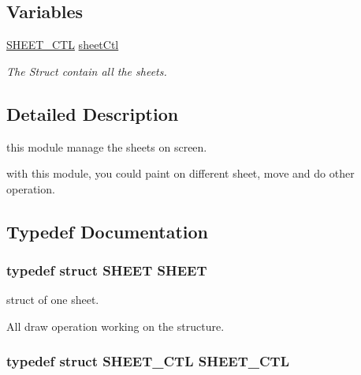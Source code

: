\subsection*{Variables}
\begin{DoxyCompactItemize}
\item 
\hypertarget{group__sheet_ga8fa9be897b3aa6ac0515ac063fd155ce}{}\hyperlink{struct_s_h_e_e_t___c_t_l}{S\+H\+E\+E\+T\+\_\+\+C\+T\+L} \hyperlink{group__sheet_ga8fa9be897b3aa6ac0515ac063fd155ce}{sheet\+Ctl}\label{group__sheet_ga8fa9be897b3aa6ac0515ac063fd155ce}

\begin{DoxyCompactList}\small\item\em The Struct contain all the sheets. \end{DoxyCompactList}\end{DoxyCompactItemize}


\subsection{Detailed Description}
this module manage the sheets on screen. 

with this module, you could paint on different sheet, move and do other operation. 

\subsection{Typedef Documentation}
\hypertarget{group__sheet_ga23b899e9e9ca793355d135d465a525ec}{}
\subsubsection[{S\+H\+E\+E\+T}]{\setlength{\rightskip}{0pt plus 5cm}typedef struct {\bf S\+H\+E\+E\+T} {\bf S\+H\+E\+E\+T}}\label{group__sheet_ga23b899e9e9ca793355d135d465a525ec}


struct of one sheet. 

All draw operation working on the structure. \hypertarget{group__sheet_ga834357b928338fffff2455b852af235d}{}
\subsubsection[{S\+H\+E\+E\+T\+\_\+\+C\+T\+L}]{\setlength{\rightskip}{0pt plus 5cm}typedef struct {\bf S\+H\+E\+E\+T\+\_\+\+C\+T\+L} {\bf S\+H\+E\+E\+T\+\_\+\+C\+T\+L}}\label{group__sheet_ga834357b928338fffff2455b852af235d}


